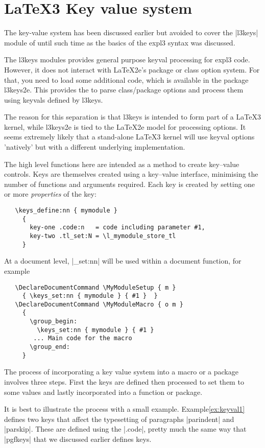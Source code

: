 \chapter{LaTeX3 Key value system}
\label{l3:keys}
The key-value system has been discussed earlier but avoided to cover the |l3keys| module of  until such time as the basics of the expl3 syntax was discussed. 


The l3keys modules provides general purpose keyval processing for expl3 code. However, it does not interact with LaTeX2e's package or class option system. For that, you need to load some additional code, which is available in the package l3keys2e. This provides the  to parse class/package options and process them using keyvals defined by l3keys.

The reason for this separation is that l3keys is intended to form part of a LaTeX3 kernel, while l3keys2e is tied to the LaTeX2e model for processing options. It seems extremely likely that a stand-alone LaTeX3 kernel will use keyval options 'natively' but with a different underlying implementation.

 The high level functions here are intended as a method to create
 key--value controls. Keys are themselves created using a key--value
 interface, minimising the number of functions and arguments
 required. Each key is created by setting one or more \emph{properties}
 of the key:
 \begin{verbatim}
   \keys_define:nn { mymodule }
     {
       key-one .code:n   = code including parameter #1,
       key-two .tl_set:N = \l_mymodule_store_tl
     }
 \end{verbatim}
 
  At a document level, |\keys_set:nn| will be used within a
 document function, for example
 \begin{verbatim}
   \DeclareDocumentCommand \MyModuleSetup { m }
     { \keys_set:nn { mymodule } { #1 }  }
   \DeclareDocumentCommand \MyModuleMacro { o m }
     {
       \group_begin:
         \keys_set:nn { mymodule } { #1 }
        ... Main code for the macro
       \group_end:
     }
 \end{verbatim}
 
 The process of incorporating a key value system into a macro or a package involves three steps. First the keys are defined then processed to set them to some values and lastly incorporated into a function or package.
 
 It is best to illustrate the process with a small example. Example\ref{ex:keyval1} defines two keys that affect the typesetting of paragraphs |parindent| and |parskip|. These are defined using the |.code|, pretty much the same way that |pgfkeys| that we discussed earlier defines keys. 
 
